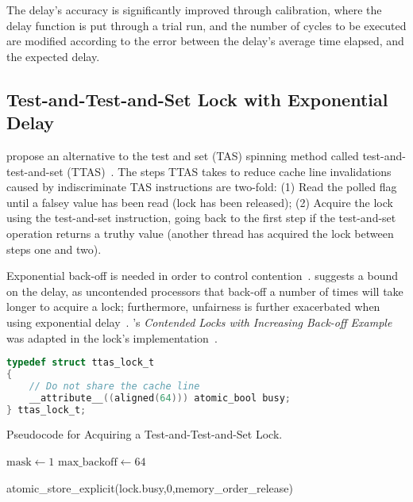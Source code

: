 The delay's accuracy is significantly improved through calibration, where the
delay function is put through a trial run, and the number of cycles to be
executed are modified according to the error between the delay's average time
elapsed, and the expected delay.

\subsection{Test-and-Test-and-Set Lock with Exponential Delay}
\citeauthor{rudolph1984dynamic} propose an alternative to the test and set
(TAS) spinning method called test-and-test-and-set
(TTAS)~\citep{rudolph1984dynamic}. The steps TTAS takes to reduce cache line
invalidations caused by indiscriminate TAS instructions are two-fold: (1) Read
the polled flag until a falsey value has been read (lock has been released);
(2) Acquire the lock using the test-and-set instruction, going back to the
first step if the test-and-set operation returns a truthy value (another thread
has acquired the lock between steps one and two). 

Exponential back-off is needed in order to control
contention~\citep{valois1994queues}. \citeauthor{anderson1990performance}
suggests a bound on the delay, as uncontended processors that back-off a number
of times will take longer to acquire a lock; furthermore, unfairness is further
exacerbated when using exponential delay~\citep[Section~7.4]{herlihy2020art}.
\citeauthor{intelmanualoptimization}'s \emph{Contended Locks with Increasing
Back-off Example} was adapted in the lock's implementation~\citep{intelmanualoptimization}.

\begin{lstlisting}[language=C,caption={Test-and-Test-and-Set Lock Struct.}]
typedef struct ttas_lock_t
{
    // Do not share the cache line
    __attribute__((aligned(64))) atomic_bool busy;
} ttas_lock_t;

\end{lstlisting}

\begin{algorithm}
    \caption{Pseudocode for Acquiring a Test-and-Test-and-Set
    Lock.}\label{alg:ttas_acquire}
        $\text{mask} \gets 1$
        $\text{max\_backoff} \gets 64$
            {
            
        }
        atomic\_store\_explicit(lock.busy,0,memory\_order\_release)
\end{algorithm}

